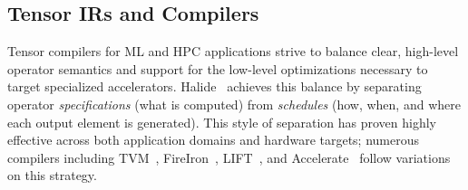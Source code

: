 \documentclass[prologue, dvipsnames, sigplan, screen, review, anonymous]{acmart}
\newcommand{\tcd}[1]{\texttt{#1}}
\begin{document}

\subsection{Tensor IRs and Compilers}



Tensor compilers for ML and HPC applications strive
  to balance clear, high-level operator semantics
  and support for the low-level optimizations
  necessary to target specialized accelerators.
Halide~\cite{ragan2013halide}
  achieves this balance by separating
  operator \textit{specifications} (what is computed) from
  \textit{schedules} (how, when, and where
  each output element is generated).
This style of separation has proven
  highly effective across both
  application domains and hardware targets;
  numerous compilers including TVM~\cite{chen2018tvm},
  FireIron~\cite{hagedorn2020fireiron},
  LIFT~\cite{lift}, and Accelerate~\cite{accelerate}
  follow variations on this strategy.
  
\end{document}
